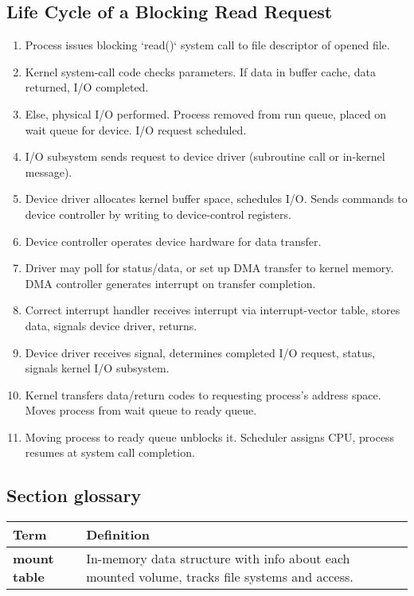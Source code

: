 \subsection{Life Cycle of a Blocking Read Request}
\begin{enumerate}
    \item Process issues blocking `read()` system call to file descriptor of opened file.
    \item Kernel system-call code checks parameters. If data in buffer cache, data returned, I/O completed.
    \item Else, physical I/O performed. Process removed from run queue, placed on wait queue for device. I/O request scheduled.
    \item I/O subsystem sends request to device driver (subroutine call or in-kernel message).
    \item Device driver allocates kernel buffer space, schedules I/O. Sends commands to device controller by writing to device-control registers.
    \item Device controller operates device hardware for data transfer.
    \item Driver may poll for status/data, or set up DMA transfer to kernel memory. DMA controller generates interrupt on transfer completion.
    \item Correct interrupt handler receives interrupt via interrupt-vector table, stores data, signals device driver, returns.
    \item Device driver receives signal, determines completed I/O request, status, signals kernel I/O subsystem.
    \item Kernel transfers data/return codes to requesting process's address space. Moves process from wait queue to ready queue.
    \item Moving process to ready queue unblocks it. Scheduler assigns CPU, process resumes at system call completion.
\end{enumerate}

\subsection{Section glossary}
\begin{tabular}{p{}p{}}
    \toprule
    \textbf{Term} & \textbf{Definition} \\
    \midrule
    \textbf{mount table} & In-memory data structure with info about each mounted volume, tracks file systems and access. \\
    \bottomrule
\end{tabular}
